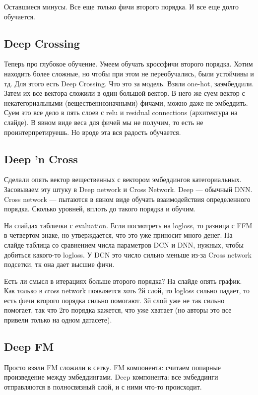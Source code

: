 \documentclass[12pt]{article}
\begin{document}
Оставшиеся минусы. Все еще только фичи второго порядка. И все еще долго обучается.

\subsection{Deep Crossing} 

Теперь про глубокое обучение. Умеем обучать кроссфичи второго порядка. Хотим находить более сложные, но чтобы при этом не переобучались, были устойчивы и тд. Для этого есть Deep Crossing. Что это за модель. Взяли one-hot, заэмбеддили. Затем их все вектора сложили в один большой вектор. В него же суем вектор с некатегориальными (вещественнозначными) фичами, можно даже не эмбеддить. Суем это все дело в пять слоев с relu и residual connections (архитектура на слайде). В явном виде веса для фичей мы не получим, то есть не проинтерпретируешь. Но вроде эта вся радость обучается. 

\subsection{Deep 'n Cross} 

Сделали опять вектор вещественных с вектором эмбеддингов категориальных. Засовываем эту штуку в Deep network и Cross Network. Deep --- обычный DNN. Cross network --- пытаются в явном виде обучать взаимодействия определенного порядка. Сколько уровней, вплоть до такого порядка и обучим.

На слайдах таблички с evaluation. Если посмотреть на logloss, то разница с FFM в четвертом знаке, но утверждается, что это уже приносит много денег. На слайде таблица со сравнением числа параметров DCN и DNN, нужных, чтобы добиться какого-то logloss. У DCN это число сильно меньше из-за Cross network подсетки, тк она дает высшие фичи.

Есть ли смысл в итерациях больше второго порядка? На слайде опять график. Как только в cross network появляется хоть 2й слой, то logloss сильно падает, то есть фичи второго порядка сильно помогают. 3й слой уже не так сильно помогает, так что 2го порядка кажется, что уже хватает (но авторы это все привели только на одном датасете).

\subsection{Deep FM}

Просто взяли FM  сложили в сетку. FM компонента: считаем попарные произведение между эмбеддингами. Deep компонента: все эмбеддинги отправляются в полносвязный слой, и с ними что-то происходит. 
\end{document}
